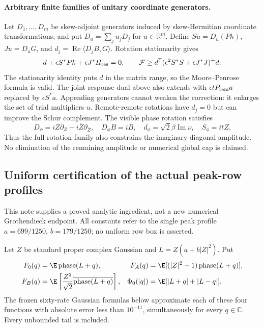 \paragraph{Arbitrary finite families of unitary coordinate generators.}
Let $D_1,\dots,D_m$ be skew-adjoint generators induced by skew-Hermitian
coordinate transformations, and put $D_u=\sum_j u_jD_j$ for $u\in\mathbb R^m$.
Define $Su=D_u(Ph)$, $Ju=D_uG$, and $d_j=\operatorname{Re}\langle D_jB,G\rangle$.
Rotation stationarity gives
\[
 d+\epsilon S^*Pk+\epsilon J^*H_{\rm res}=0,
 \qquad
 \mathcal F\ge d^{\mathsf T}
       (\epsilon^2S^*S+\epsilon J^*J)^+d.
\]
The stationarity identity puts $d$ in the matrix range, so the
Moore--Penrose formula is valid. The joint response dual above also
extends with $\epsilon tP_{\rm rem}a$ replaced by $\epsilon S^*a$.
Appending generators cannot weaken the correction: it enlarges the set of
trial multipliers $u$. Remote-remote rotations have $d_j=0$ but can improve
the Schur complement. The visible phase rotation satisfies
\[
 D_\phi=iZ\partial_Z-i\bar Z\partial_{\bar Z},\quad
 D_\phi B=iB,\quad
 d_\phi=\sqrt2\beta\operatorname{Im}\nu,\quad S_\phi=itZ.
\]
Thus the full rotation family also constrains the imaginary diagonal
amplitude. No elimination of the remaining amplitude or numerical global
cap is claimed.


\subsection{Uniform certification of the actual peak-row profiles}



This note supplies a proved analytic ingredient, not a new numerical
Grothendieck endpoint. All constants refer to the single peak profile
$a=699/1250$, $b=179/1250$; no uniform row box is asserted.

\begin{theorem}
Let $Z$ be standard proper complex Gaussian and $L=Z(a+b|Z|^2)$. Put
\begin{align*}
 F_0(q)&=\E\ph(L+q),&
 F_A(q)&=\E[(|Z|^2-1)\ph(L+q)],\\
 F_B(q)&=\E\left[\frac{Z^2}{\sqrt2}\overline{\ph(L+q)}\right],&
 \Phi_0(|q|)&=\E[|L+q|+|L-q|].
\end{align*}
The frozen sixty-rate Gaussian formulas below approximate each of these
four functions with absolute error less than $10^{-11}$, simultaneously
for every $q\in\mathbb C$. Every unbounded tail is included.
\end{theorem}

